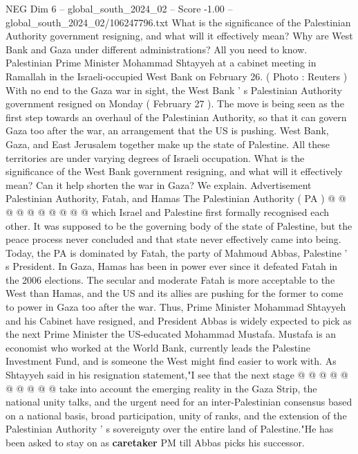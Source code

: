 \begin{textsample}{NEG Dim 6 – global\_south\_2024\_02 – Score -1.00 – global\_south\_2024\_02/106247796.txt}  \label{ex:f6_neg_277}
What is the significance of the Palestinian Authority government resigning, and what will it effectively mean?
Why are West Bank and Gaza under different administrations?
All you need to know.
Palestinian Prime Minister Mohammad Shtayyeh at a cabinet meeting in Ramallah in the Israeli-occupied West Bank on February 26. ( Photo : Reuters ) With no end to the Gaza war in sight, the West Bank ' s Palestinian Authority government resigned on Monday ( February 27 ).
The move is being seen as the first step towards an overhaul of the Palestinian Authority, so that it can govern Gaza too after the war, an arrangement that the US is pushing.
West Bank, Gaza, and East Jerusalem together make up the state of Palestine.
All these territories are under varying degrees of Israeli occupation.
What is the significance of the West Bank government resigning, and what will it effectively mean?
Can it help shorten the war in Gaza?
We explain.
Advertisement Palestinian Authority, Fatah, and Hamas The Palestinian Authority ( PA ) @ @ @ @ @ @ @ @ @ @ which Israel and Palestine first formally recognised each other.
It was supposed to be the governing body of the state of Palestine, but the peace process never concluded and that state never effectively came into being.
Today, the PA is dominated by Fatah, the party of Mahmoud Abbas, Palestine ' s President.
In Gaza, Hamas has been in power ever since it defeated Fatah in the 2006 elections.
The secular and moderate Fatah is more acceptable to the West than Hamas, and the US and its allies are pushing for the former to come to power in Gaza too after the war.
Thus, Prime Minister Mohammad Shtayyeh and his Cabinet have resigned, and President Abbas is widely expected to pick as the next Prime Minister the US-educated Mohammad Mustafa.
Mustafa is an economist who worked at the World Bank, currently leads the Palestine Investment Fund, and is someone the West might find easier to work with.
As Shtayyeh said in his resignation statement,"I see that the next stage @ @ @ @ @ @ @ @ @ @ take into account the emerging reality in the Gaza Strip, the national unity talks, and the urgent need for an inter-Palestinian consensus based on a national basis, broad participation, unity of ranks, and the extension of the Palestinian Authority ' s sovereignty over the entire land of Palestine."He has been asked to stay on as \textbf{caretaker} PM till Abbas picks his successor.

\end{textsample}
